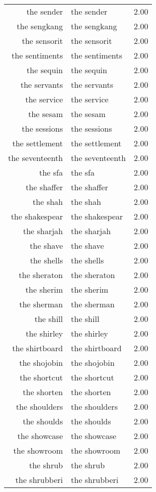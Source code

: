 \begin{table}[ht]
\begin{tabular}{rlr}
  the sender & the sender & 2.00 \\ 
  the sengkang & the sengkang & 2.00 \\ 
  the sensorit & the sensorit & 2.00 \\ 
  the sentiments & the sentiments & 2.00 \\ 
  the sequin & the sequin & 2.00 \\ 
  the servants & the servants & 2.00 \\ 
  the service & the service & 2.00 \\ 
  the sesam & the sesam & 2.00 \\ 
  the sessions & the sessions & 2.00 \\ 
  the settlement & the settlement & 2.00 \\ 
  the seventeenth & the seventeenth & 2.00 \\ 
  the sfa & the sfa & 2.00 \\ 
  the shaffer & the shaffer & 2.00 \\ 
  the shah & the shah & 2.00 \\ 
  the shakespear & the shakespear & 2.00 \\ 
  the sharjah & the sharjah & 2.00 \\ 
  the shave & the shave & 2.00 \\ 
  the shells & the shells & 2.00 \\ 
  the sheraton & the sheraton & 2.00 \\ 
  the sherim & the sherim & 2.00 \\ 
  the sherman & the sherman & 2.00 \\ 
  the shill & the shill & 2.00 \\ 
  the shirley & the shirley & 2.00 \\ 
  the shirtboard & the shirtboard & 2.00 \\ 
  the shojobin & the shojobin & 2.00 \\ 
  the shortcut & the shortcut & 2.00 \\ 
  the shorten & the shorten & 2.00 \\ 
  the shoulders & the shoulders & 2.00 \\ 
  the shoulds & the shoulds & 2.00 \\ 
  the showcase & the showcase & 2.00 \\ 
  the showroom & the showroom & 2.00 \\ 
  the shrub & the shrub & 2.00 \\ 
  the shrubberi & the shrubberi & 2.00 \\ 

\end{tabular}
\end{table}
